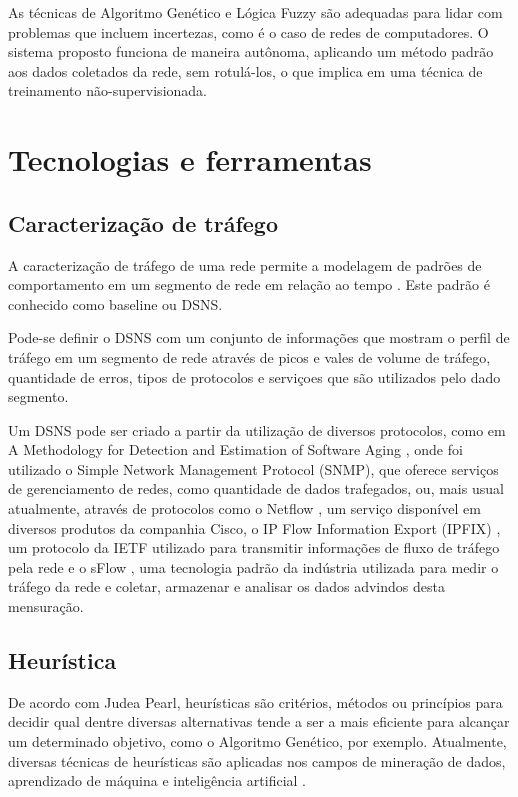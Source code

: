 \documentclass[openright]{normas-utf-tex} %
\begin{document}
	As técnicas de Algoritmo Genético e Lógica Fuzzy são adequadas para lidar com problemas que incluem incertezas, como é o caso de redes de computadores. O sistema proposto funciona de maneira autônoma, aplicando um método padrão aos dados coletados da rede, sem rotulá-los, o que implica em uma técnica de treinamento não-supervisionada.
	
\chapter{Tecnologias e ferramentas}

\section{Caracterização de tráfego}
 A caracterização de tráfego de uma rede permite a modelagem de padrões de comportamento em um segmento de rede em relação ao tempo \cite{proenca}. Este padrão é conhecido como baseline ou DSNS.
 
	Pode-se definir o DSNS com um conjunto de informações que mostram o perfil de tráfego em um segmento de rede através de picos e vales de volume de tráfego, quantidade de erros, tipos de protocolos e serviçoes que são utilizados pelo dado segmento.
	
	Um DSNS pode ser criado a partir da utilização de diversos protocolos, como em A Methodology for Detection and Estimation of Software Aging \cite{aging}, onde foi utilizado o Simple Network Management Protocol (SNMP), que oferece serviços de gerenciamento de redes, como quantidade de dados trafegados, ou, mais  usual atualmente, através de protocolos como o Netflow \cite{netflow}, um serviço disponível em diversos produtos da companhia Cisco, o IP Flow Information Export (IPFIX) \cite{ipfix}, um protocolo da IETF utilizado para transmitir informações de fluxo de tráfego pela rede e o sFlow \cite{sflow}, uma tecnologia padrão da indústria utilizada para medir o tráfego da rede e coletar, armazenar e analisar os dados advindos desta mensuração.
	
\section{Heurística}

De acordo com Judea Pearl, heurísticas são critérios, métodos ou princípios para decidir qual dentre diversas alternativas tende a ser a mais eficiente para alcançar um determinado objetivo, como o Algoritmo Genético, por exemplo. Atualmente, diversas técnicas de heurísticas são aplicadas nos campos de mineração de dados, aprendizado de máquina e inteligência artificial \cite{judea}.
\end{document}
